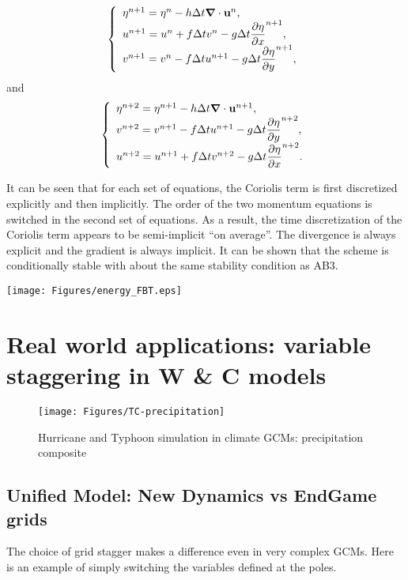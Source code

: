 \[
\left\{ \begin{array}{l}
	\eta^{n+1} = \eta^n - h \Delta t \mbox{\boldmath $\nabla$} \cdot \mathbf{u}^n,
	\\
	u^{n+1} = u^n + f \Delta t v^n - g \Delta t \displaystyle \frac{\partial \eta}{\partial x}^{n+1},
	\\
	v^{n+1} = v^n - f \Delta t u^{n+1} - g \Delta t \displaystyle \frac{\partial \eta}{\partial y}^{n+1},
\end{array} \right.
\]
and
\[
\left\{ \begin{array}{l}
	\eta^{n+2} = \eta^{n+1} - h \Delta t \mbox{\boldmath $\nabla$} \cdot \mathbf{u}^{n+1},
	\\
	v^{n+2} = v^{n+1} - f \Delta t u^{n+1} - g \Delta t \displaystyle \frac{\partial \eta}{\partial y}^{n+2},
	\\
	u^{n+2} = u^{n+1} + f \Delta t v^{n+2} - g \Delta t \displaystyle \frac{\partial \eta}{\partial x}^{n+2}.
\end{array} \right.
\]

It can be seen that for each set of equations, the Coriolis term is first discretized explicitly and then implicitly. The order of the two momentum equations is switched in the second set of equations. As a result, the time discretization of the Coriolis term appears to be semi-implicit ``on average''. The divergence is always explicit and the gradient is always implicit. It can be shown that the scheme is conditionally stable with about the same stability condition as AB3.

\begin{center}
	\texttt{[image: Figures/energy\_FBT.eps]}
\end{center}

\section{Real world applications: variable staggering in W \& C models}

\begin{figure}[h!]	
	\texttt{[image: Figures/TC-precipitation]}
	\caption{Hurricane and Typhoon simulation in climate GCMs: precipitation composite}
\end{figure}

\subsection{Unified Model: New Dynamics vs EndGame grids} 

The choice of grid stagger makes a difference even in very complex GCMs. Here is an example of simply switching the variables defined at the poles.

